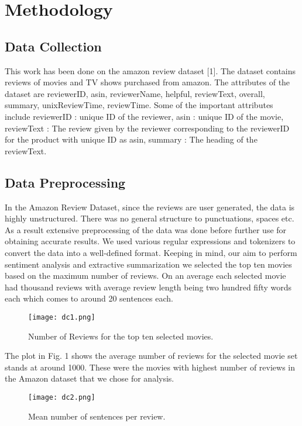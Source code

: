 \documentclass[conference]{IEEEtran}
\begin{document}
\section{Methodology}

\subsection{Data Collection}

This work has been done on the amazon review dataset [1]. The dataset contains reviews of movies and TV shows purchased from amazon. The attributes of the dataset are reviewerID, asin, reviewerName, helpful, reviewText, overall, summary, unixReviewTime, reviewTime. Some of the important attributes include reviewerID : unique ID of the reviewer, asin : unique ID of the movie, reviewText : The review given by the reviewer corresponding to the reviewerID for the product with unique ID as asin, summary : The heading of the reviewText.

\subsection{Data Preprocessing}
In the Amazon Review Dataset, since the reviews are user generated, the data is highly unstructured. There was no general structure to punctuations, spaces etc. As a result extensive preprocessing of the data was done before further use for obtaining accurate results. We used various regular expressions and tokenizers to convert the data into a well-defined format. Keeping in mind, our aim to perform sentiment analysis and extractive summarization we selected the top ten movies based on the maximum number of reviews. On an average each selected movie had thousand reviews with average review length being two hundred fifty words each which comes to around 20 sentences each. 

\begin{figure}
  \texttt{[image: dc1.png]}
  \caption{Number of Reviews for the top ten selected movies.}
  \label{fig:boat1}
\end{figure}

The plot in Fig. 1 shows the average number of reviews for the selected movie set stands at around 1000. These were the movies with highest number of reviews in the Amazon dataset that we chose for analysis.

\begin{figure}
  \texttt{[image: dc2.png]}
  \caption{Mean number of sentences per review.}
  \label{fig:boat1}
\end{figure}
\end{document}
